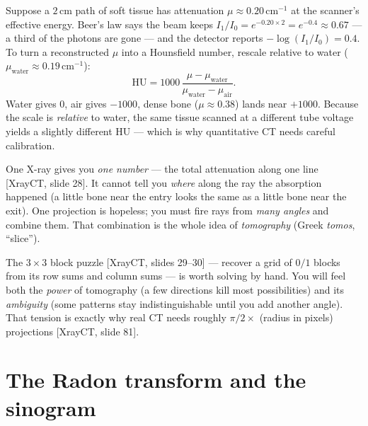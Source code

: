 \documentclass[11pt]{article}
\newcommand{\deck}[1]{\textsf{\small[#1]}}
\begin{document}
\begin{notebox}
Suppose a $2$\,cm path of soft tissue has attenuation
$\mu\approx 0.20\,\mathrm{cm}^{-1}$ at the scanner's effective energy. Beer's law
says the beam keeps $I_1/I_0=e^{-0.20\times 2}=e^{-0.4}\approx 0.67$ --- a third
of the photons are gone --- and the detector reports $-\log(I_1/I_0)=0.4$. To turn
a reconstructed $\mu$ into a Hounsfield number, rescale relative to water
($\mu_{\text{water}}\approx 0.19\,\mathrm{cm}^{-1}$):
\[
\mathrm{HU} = 1000\,\frac{\mu - \mu_{\text{water}}}{\mu_{\text{water}} - \mu_{\text{air}}} .
\]
Water gives $0$, air gives $-1000$, dense bone ($\mu\approx 0.38$) lands near
$+1000$. Because the scale is \emph{relative} to water, the same tissue scanned
at a different tube voltage yields a slightly different HU --- which is why
quantitative CT needs careful calibration.
\end{notebox}

\begin{keybox}
One X-ray gives you \emph{one number} --- the total attenuation along one line
\deck{XrayCT, slide 28}. It cannot tell you \emph{where} along the ray the
absorption happened (a little bone near the entry looks the same as a little
bone near the exit). One projection is hopeless; you must fire rays from
\emph{many angles} and combine them. That combination is the whole idea of
\emph{tomography} (Greek \emph{tomos}, ``slice'').
\end{keybox}

\begin{notebox}
The $3\times3$ block puzzle \deck{XrayCT, slides 29--30} --- recover a grid of
$0/1$ blocks from its row sums and column sums --- is worth solving by hand. You
will feel both the \emph{power} of tomography (a few directions kill most
possibilities) and its \emph{ambiguity} (some patterns stay indistinguishable
until you add another angle). That tension is exactly why real CT needs roughly
$\pi/2 \times$ (radius in pixels) projections \deck{XrayCT, slide 81}.
\end{notebox}

\section{The Radon transform and the sinogram}
\end{document}
